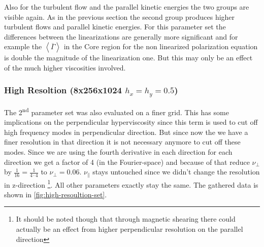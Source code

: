 \documentclass[master.tex]{subfiles}
\begin{document}
Also for the turbulent flow and the parallel kinetic energies the two groups are visible again. As in the previous section the second group produces higher turbulent flows and parallel kinetic energies.\newline
For this parameter set the differences between the linearizations are generally more significant and for example the $\left< \overline{\Gamma} \right>$ in the Core region for the non linearized polarization equation is double the magnitude of the linearization one. But this may only be an effect of the much higher viscosities involved.

\subsubsection{High Resoltion (8x256x1024 $h_x = h_y = 0.5$)}
The 2\textsuperscript{nd} parameter set was also evaluated on a finer grid. This has some implications on the perpendicular hyperviscosity since this term is used to cut off high frequency modes in perpendicular direction. But since now the we have a finer resolution in that direction it is not necessary anymore to cut off these modes. Since we are using the fourth derivative in each direction for each direction we get a factor of 4 (in the Fourier-space) and because of that reduce $\nu_\perp$ by $\frac{1}{16} = \frac{1}{4\cdot4}$ to $\nu_\perp = 0.06$. $\nu_\parallel$ stays untouched since we didn't change the resolution in z-direction \footnote{It should be noted though that through magnetic shearing there could actually be an effect from higher perpendicular resolution on the parallel direction}. All other parameters exactly stay the same. The gathered data is shown in \autoref{fig:high-resoultion-set}. 
\end{document}
